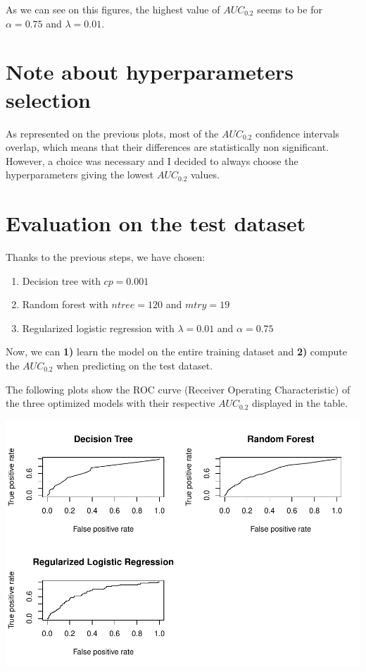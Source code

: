 \documentclass[
  12pt,
  oneside]{report}
\begin{document}
As we can see on this figures, the highest value of \(AUC_{0.2}\) seems to be for \(\alpha = 0.75\) and \(\lambda = 0.01\).

\hypertarget{note-about-hyperparameters-selection}{%
\section{Note about hyperparameters selection}\label{note-about-hyperparameters-selection}}

As represented on the previous plots, most of the \(AUC_{0.2}\) confidence intervals overlap, which means that their differences are statistically non significant. However, a choice was necessary and I decided to always choose the hyperparameters giving the lowest \(AUC_{0.2}\) values.

\hypertarget{evaluation-on-the-test-dataset}{%
\section{Evaluation on the test dataset}\label{evaluation-on-the-test-dataset}}

Thanks to the previous steps, we have chosen:

\begin{enumerate}
\def\labelenumi{\arabic{enumi}.}
\item
  Decision tree with \(cp = 0.001\)
\item
  Random forest with \(ntree = 120\) and \(mtry = 19\)
\item
  Regularized logistic regression with \(\lambda = 0.01\) and \(\alpha = 0.75\)
\end{enumerate}

Now, we can \textbf{1)} learn the model on the entire training dataset and \textbf{2)} compute the \(AUC_{0.2}\) when predicting on the test dataset.

The following plots show the ROC curve (Receiver Operating Characteristic) of the three optimized models with their respective \(AUC_{0.2}\) displayed in the table.

\includegraphics[width=1.5\linewidth]{leroy_francois_hw2_files/figure-latex/unnamed-chunk-17-1}
\end{document}
